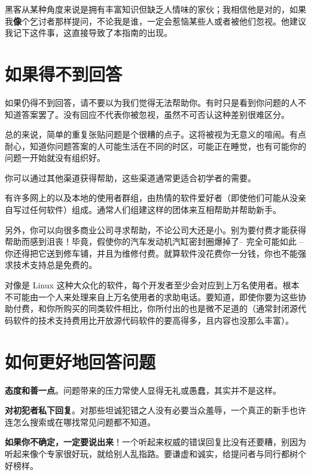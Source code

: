 \documentclass[titlepage]{article}
\begin{document}
黑客从某种角度来说是拥有丰富知识但缺乏人情味的家伙；我相信他是对的，如果我\textbf{像}个乞讨者那样提问，不论我是谁，一定会惹恼某些人或者被他们忽视。他建议我记下这件事，这直接导致了本指南的出现。

\hypertarget{ux5982ux679cux5f97ux4e0dux5230ux56deux7b54}{\section{如果得不到回答}\label{ux5982ux679cux5f97ux4e0dux5230ux56deux7b54}}

如果仍得不到回答，请不要以为我们觉得无法帮助你。有时只是看到你问题的人不知道答案罢了。没有回应不代表你被忽视，虽然不可否认这种差别很难区分。

总的来说，简单的重复张贴问题是个很糟的点子。这将被视为无意义的喧闹。有点耐心，知道你问题答案的人可能生活在不同的时区，可能正在睡觉，也有可能你的问题一开始就没有组织好。

你可以通过其他渠道获得帮助，这些渠道通常更适合初学者的需要。

有许多网上的以及本地的使用者群组，由热情的软件爱好者（即使他们可能从没亲自写过任何软件）组成。通常人们组建这样的团体来互相帮助并帮助新手。

另外，你可以向很多商业公司寻求帮助，不论公司大还是小。别为要付费才能获得帮助而感到沮丧！毕竟，假使你的汽车发动机汽缸密封圈爆掉了--
完全可能如此
--你还得把它送到修车铺，并且为维修付费。就算软件没花费你一分钱，你也不能强求技术支持总是免费的。

对像是 Linux
这种大众化的软件，每个开发者至少会对应到上万名使用者。根本不可能由一个人来处理来自上万名使用者的求助电话。要知道，即使你要为这些协助付费，和你所购买的同类软件相比，你所付出的也是微不足道的（通常封闭源代码软件的技术支持费用比开放源代码软件的要高得多，且内容也没那么丰富）。

\hypertarget{ux5982ux4f55ux66f4ux597dux5730ux56deux7b54ux95eeux9898}{\section{如何更好地回答问题}\label{ux5982ux4f55ux66f4ux597dux5730ux56deux7b54ux95eeux9898}}

\textbf{态度和善一点}。问题带来的压力常使人显得无礼或愚蠢，其实并不是这样。

\textbf{对初犯者私下回复}。对那些坦诚犯错之人没有必要当众羞辱，一个真正的新手也许连怎么搜索或在哪找常见问题都不知道。

\textbf{如果你不确定，一定要说出来}！一个听起来权威的错误回复比没有还要糟，别因为听起来像个专家很好玩，就给别人乱指路。要谦虚和诚实，给提问者与同行都树个好榜样。
\end{document}
